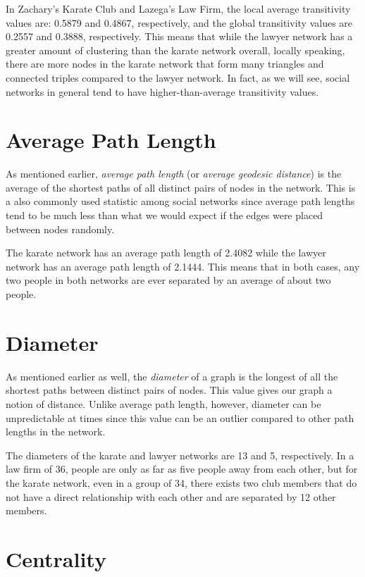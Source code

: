 \documentclass[12pt,twoside]{amherstthesis}
\begin{document}
  In Zachary's Karate Club and Lazega's Law Firm, the local average
  transitivity values are: 0.5879 and 0.4867, respectively, and the global
  transitivity values are 0.2557 and 0.3888, respectively. This means that
  while the lawyer network has a greater amount of clustering than the
  karate network overall, locally speaking, there are more nodes in the
  karate network that form many triangles and connected triples compared
  to the lawyer network. In fact, as we will see, social networks in
  general tend to have higher-than-average transitivity values.
  
  \section{Average Path Length}\label{average-path-length}
  
  As mentioned earlier, \emph{average path length} (or \emph{average
  geodesic distance}) is the average of the shortest paths of all distinct
  pairs of nodes in the network. This is a also commonly used statistic
  among social networks since average path lengths tend to be much less
  than what we would expect if the edges were placed between nodes
  randomly.
  
  The karate network has an average path length of 2.4082 while the lawyer
  network has an average path length of 2.1444. This means that in both
  cases, any two people in both networks are ever separated by an average
  of about two people.
  
  \section{Diameter}\label{diameter}
  
  As mentioned earlier as well, the \emph{diameter} of a graph is the
  longest of all the shortest paths between distinct pairs of nodes. This
  value gives our graph a notion of distance. Unlike average path length,
  however, diameter can be unpredictable at times since this value can be
  an outlier compared to other path lengths in the network.
  
  The diameters of the karate and lawyer networks are 13 and 5,
  respectively. In a law firm of 36, people are only as far as five people
  away from each other, but for the karate network, even in a group of 34,
  there exists two club members that do not have a direct relationship
  with each other and are separated by 12 other members.
  
  \section{Centrality}\label{centrality}
  
\end{document}
